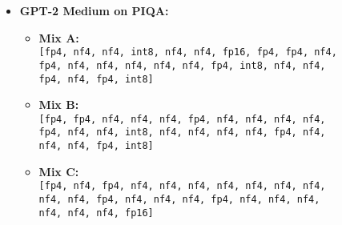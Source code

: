 \documentclass{article}
\begin{document}
\begin{figure}[ht]
\begin{minipage}[t]{\textwidth}
{\begin{itemize}
\begin{itemize}
				\item \textbf{Mix B:}\\
				\texttt{[fp4, fp4, nf4, nf4, nf4, fp4, nf4, nf4, nf4, nf4, fp4, nf4, nf4, int8, nf4, nf4, nf4, nf4, fp4, nf4, nf4, nf4, fp4, int8]}
				
				\item \textbf{Mix C:}\\
				\texttt{[fp4, nf4, fp4, nf4, nf4, nf4, nf4, nf4, nf4, nf4, nf4, nf4, fp4, nf4, nf4, nf4, fp4, nf4, nf4, nf4, nf4, nf4, nf4, fp16]}
			\end{itemize}
			\item \textbf{GPT-2 Medium on PIQA:}
			\begin{itemize}
				\item \textbf{Mix A:}\\
				\texttt{[fp4, nf4, nf4, int8, nf4, nf4, fp16, fp4, fp4, nf4, fp4, nf4, nf4, nf4, nf4, nf4, fp4, int8, nf4, nf4, fp4, nf4, fp4, int8]}
				
				\item \textbf{Mix B:}\\
				\texttt{[fp4, fp4, nf4, nf4, nf4, fp4, nf4, nf4, nf4, nf4, fp4, nf4, nf4, int8, nf4, nf4, nf4, nf4, fp4, nf4, nf4, nf4, fp4, int8]}
				
				\item \textbf{Mix C:}\\
				\texttt{[fp4, nf4, fp4, nf4, nf4, nf4, nf4, nf4, nf4, nf4, nf4, nf4, fp4, nf4, nf4, nf4, fp4, nf4, nf4, nf4, nf4, nf4, nf4, fp16]}
			\end{itemize}
		\end{itemize}
		
	} %
	\end{minipage}
	\end{figure}
		
	
\end{document}
